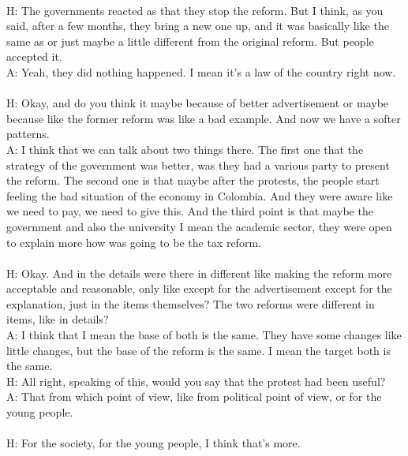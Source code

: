 \documentclass{phyasgn}\usepackage{nag}
\begin{document}
\\
H: The governments reacted as that they stop the reform. But I think, as you said, after a few months, they bring a new one up, and it was basically like the same as or just maybe a little different from the original reform. But people accepted it.\\
A: Yeah, they did nothing happened. I mean it's a law of the country right now.\\
\\
H: Okay, and do you think it maybe because of better advertisement or maybe because like the former reform was like a bad example. And now we have a softer patterns.\\
A: I think that we can talk about two things there. The first one that the strategy of the government was better, was they had a various party to present the reform. The second one is that maybe after the protests, the people start feeling the bad situation of the economy in Colombia. And they were aware like we need to pay, we need to give this. And the third point is that maybe the government and also the university I mean the academic sector, they were open to explain more how was going to be the tax reform.\\
\\
H: Okay. And in the details were there in different like making the reform more acceptable and reasonable, only like except for the advertisement except for the explanation, just in the items themselves? The two reforms were different in items, like in details?\\
A: I think that I mean the base of both is the same. They have some changes like little changes, but the base of the reform is the same. I mean the target both is the same.\\
H: All right, speaking of this, would you say that the protest had been useful?\\
A: That from which point of view, like from political point of view, or for the young people.\\
\\
H: For the society, for the young people, I think that's more.\\
\end{document}
